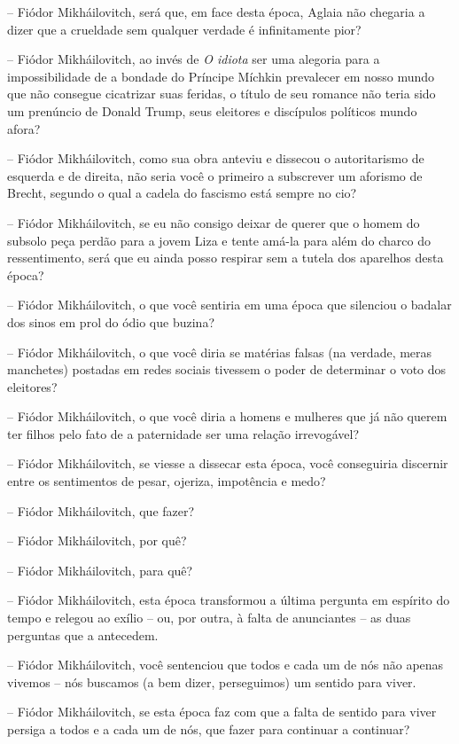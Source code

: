 -- Fiódor Mikháilovitch, será que, em face desta época, Aglaia não
chegaria a dizer que a crueldade sem qualquer verdade é infinitamente
pior?

-- Fiódor Mikháilovitch, ao invés de \emph{O idiota} ser uma alegoria
para a impossibilidade de a bondade do Príncipe Míchkin prevalecer em
nosso mundo que não consegue cicatrizar suas feridas, o título de seu
romance não teria sido um prenúncio de Donald Trump, seus eleitores e
discípulos políticos mundo afora?

-- Fiódor Mikháilovitch, como sua obra anteviu e dissecou o
autoritarismo de esquerda e de direita, não seria você o primeiro a
subscrever um aforismo de Brecht, segundo o qual a cadela do fascismo
está sempre no cio?

-- Fiódor Mikháilovitch, se eu não consigo deixar de querer que o homem
do subsolo peça perdão para a jovem Liza e tente amá-la para além do
charco do ressentimento, será que eu ainda posso respirar sem a tutela
dos aparelhos desta época?

-- Fiódor Mikháilovitch, o que você sentiria em uma época que silenciou
o badalar dos sinos em prol do ódio que buzina?

-- Fiódor Mikháilovitch, o que você diria se matérias falsas (na
verdade, meras manchetes) postadas em redes sociais tivessem o poder de
determinar o voto dos eleitores?

-- Fiódor Mikháilovitch, o que você diria a homens e mulheres que já não
querem ter filhos pelo fato de a paternidade ser uma relação
irrevogável?

-- Fiódor Mikháilovitch, se viesse a dissecar esta época, você
conseguiria discernir entre os sentimentos de pesar, ojeriza, impotência
e medo?

-- Fiódor Mikháilovitch, que fazer?

-- Fiódor Mikháilovitch, por quê?

-- Fiódor Mikháilovitch, para quê?

-- Fiódor Mikháilovitch, esta época transformou a última pergunta em
espírito do tempo e relegou ao exílio -- ou, por outra, à falta de
anunciantes -- as duas perguntas que a antecedem.

-- Fiódor Mikháilovitch, você sentenciou que todos e cada um de nós não
apenas vivemos -- nós buscamos (a bem dizer, perseguimos) um sentido
para viver.

-- Fiódor Mikháilovitch, se esta época faz com que a falta de sentido
para viver persiga a todos e a cada um de nós, que fazer para continuar
a continuar?

